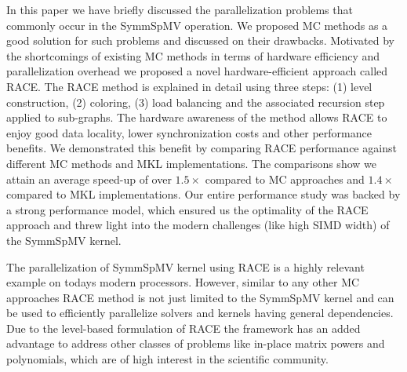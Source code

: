 In this paper we have briefly discussed the parallelization problems
that commonly occur in the \acrshort{SymmSpMV} operation.
We proposed \acrshort{MC} methods as a good solution
for such problems and discussed on their drawbacks.
Motivated by the shortcomings of existing \acrshort{MC} methods in 
terms of hardware efficiency and parallelization overhead we proposed 
a novel hardware-efficient approach called \acrshort{RACE}.
The \acrshort{RACE} method is explained in detail using
three steps: (1) level construction, (2) \DK coloring, (3) load balancing 
and the associated recursion step applied to sub-graphs. 
The hardware awareness of the method allows \acrshort{RACE} to
enjoy good data locality, lower synchronization costs and other performance
benefits. We demonstrated this benefit  by comparing 
\acrshort{RACE} performance against different \acrshort{MC} methods and \acrshort{MKL}
implementations. The comparisons show 
we attain an average speed-up of over $1.5\times$ compared to \acrshort{MC}
approaches and $1.4\times$ compared to \acrshort{MKL} implementations.
Our entire performance study was backed by a strong performance model, 
which ensured us the optimality of the \acrshort{RACE} approach and
threw light into the modern challenges (like high SIMD width) of the
\acrshort{SymmSpMV} kernel.

The parallelization of \acrshort{SymmSpMV} kernel using \acrshort{RACE}
is a highly relevant example on todays modern processors.
However, similar to any other \acrshort{MC} approaches \acrshort{RACE} method 
is not just limited to the \acrshort{SymmSpMV} kernel
and can be used to efficiently parallelize solvers and kernels 
having general \DK dependencies. Due to the level-based formulation
of \acrshort{RACE} the framework has an added advantage to address 
other classes of problems like in-place matrix powers and polynomials,
which are of high interest in the scientific community.

